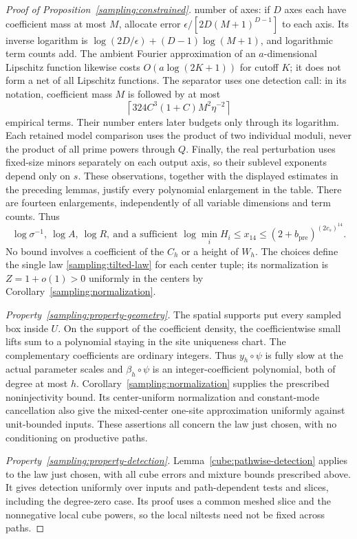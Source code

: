 \begin{proof}[Proof of Proposition~\ref{sampling:constrained}]
number of axes: if $D$ axes each have coefficient mass at most $M$,
allocate error $\epsilon/[2D(M+1)^{D-1}]$ to each axis.  Its inverse
logarithm is
$\log(2D/\epsilon)+(D-1)\log(M+1)$, and logarithmic term counts
add.  The ambient Fourier approximation of an $a$-dimensional
Lipschitz function likewise costs $O(a\log(2K+1))$ for cutoff $K$;
it does not form a net of all Lipschitz functions.
The separator uses one detection call: in its notation, coefficient
mass $M$ is followed by at most
\[
 \left\lceil324C^3(1+C)M^2\eta^{-2}\right\rceil
\]
empirical terms.  Their number enters later budgets only through its
logarithm.  Each retained model comparison uses the product of two
individual moduli, never the product of all prime powers through $Q$.
Finally, the real perturbation uses fixed-size minors separately on
each output axis, so their sublevel exponents depend only on $s$.
These observations, together with the displayed estimates in the
preceding lemmas, justify every polynomial enlargement in the table.
There are fourteen enlargements, independently of all variable dimensions
and term counts.  Thus
\[
 \log\sigma^{-1},\ \log A,\ \log R,
 \ \text{and a sufficient }\log\min_iH_i
 \le x_{14}\le(2+b_{\mathrm{pre}})^{(2c_s)^{14}}.
\]
No bound involves a coefficient of the $C_h$ or a height of $W_h$.
The choices define the single law
\eqref{sampling:tilted-law} for each center tuple; its normalization is
$Z=1+o(1)>0$ uniformly in the centers by
Corollary~\ref{sampling:normalization}.

\emph{Property~\ref{sampling:property-geometry}.}
The spatial supports put every sampled box inside $U$.  On the support
of the coefficient density, the coefficientwise small lifts sum to a
polynomial staying in the site uniqueness chart.  The complementary
coefficients are ordinary integers.  Thus $y_h\circ\psi$ is fully slow
at the actual parameter scales and $\beta_h\circ\psi$ is an
integer-coefficient polynomial, both of degree at most $h$.
Corollary~\ref{sampling:normalization} supplies the prescribed
noninjectivity bound.  Its center-uniform normalization and constant-mode
cancellation also give the mixed-center one-site approximation uniformly
against unit-bounded inputs.  These assertions all concern the law just
chosen, with no conditioning on productive paths.

\emph{Property~\ref{sampling:property-detection}.}
Lemma~\ref{cube:pathwise-detection} applies to the law just chosen,
with all cube errors and mixture bounds prescribed above.  It gives
detection uniformly over inputs and path-dependent tests and slices,
including the degree-zero case.  Its proof uses a common meshed slice
and the nonnegative local cube powers, so the local niltests need not
be fixed across paths.


\end{proof}
